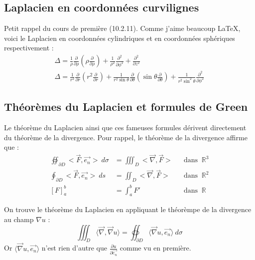 \documentclass[11pt, a4paper, openany]{book}
\begin{document}
				\subsection{Laplacien en coordonnées curvilignes}
				Petit rappel du cours de première (10.2.11). Comme j'aime beaucoup \LaTeX, voici le Laplacien
				en coordonnées cylindriques et en coordonnées sphériques respectivement :
				\begin{eqnarray}
					\Delta = \frac{1}{\rho}\frac{\partial}{\partial\rho}\left(\rho\frac{\partial}{\partial\rho}\right)
					+\frac{1}{\rho^2}\frac{\partial^2}{\partial\phi^2}+ \frac{\partial^2}{\partial z^2}\\
					\Delta = \frac{1}{r^2}\frac{\partial}{\partial r}\left(r^2\frac{\partial}{\partial r}\right) +
					\frac{1}{r^2\sin\theta}\frac{\partial}{\partial\theta}\left(\sin\theta\frac{\partial}{\partial
						\theta}\right) + \frac{1}{r^2\sin^2\theta}\frac{\partial^2}{\partial\phi^2}
				\end{eqnarray}
																		
				\subsection{Théorèmes du Laplacien et formules de Green}
				Le théorème du Laplacien ainsi que ces fameuses formules dérivent directement du théorème de
				la divergence. Pour rappel, le théorème de la divergence affirme que :
				\begin{equation}
					\begin{array}{lll}
						\oiint_{\partial D} <\vec{F},\vec{e_n}>\ d\sigma & = \iiint_D <\vec{\nabla},\vec{F}> & \ \ \text{                    
						dans }\ \mathbb{R}^3\\
						\oint_{\partial D}  <\vec{F},\vec{e_n}>\ ds      & = \iint_D <\vec{\nabla},\vec{F}>  & \ \ \text{                    
						dans }\ \mathbb{R}^2\\
						\left[F\right]^b_a                               & = \int_a^b F'                     & \ \ \text{ dans }\ \mathbb{R} 
					\end{array}
				\end{equation}
																		
				On trouve le théorème du Laplacien en appliquant le théorèmpe de la divergence au champ 
				$\nabla u$ :
				\begin{equation}
					\iiint_D \langle\vec{\nabla},\vec{\nabla}u\rangle = \oiint_{\partial D} \langle\vec{\nabla}
					u, \vec{e_n}\rangle\ d\sigma
				\end{equation}
				Or $\langle\vec{\nabla}	u, \vec{e_n}\rangle$ n'est rien d'autre que $\frac{\partial u}{\partial
					\vec{e_n}}$ comme vu en première.\\
																		
\end{document}
